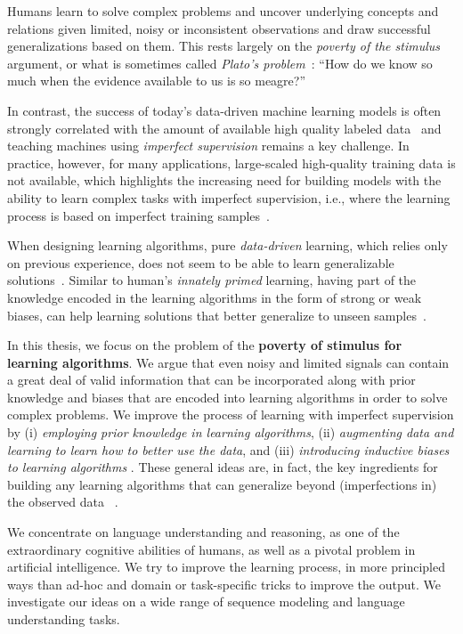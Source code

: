 \abstract
Humans learn to solve complex problems and uncover underlying concepts and relations given limited, noisy or inconsistent observations and draw successful generalizations based on them. This rests largely on the \emph{poverty of the stimulus} argument, or what is sometimes called \emph{Plato’s problem}~\citep{chomsky1986knowledge}: ``How do we know so much when the evidence available to us is so meagre?''

In contrast, the success of today's data-driven machine learning models is often strongly correlated with the amount of available high quality labeled data~\citep{halevy2009unreasonable,sun2017revisiting} and teaching machines using \emph{imperfect supervision} remains a key challenge. In practice, however, for many applications, large-scaled high-quality training data is not available, which highlights the increasing need for building models with the ability to learn complex tasks with imperfect supervision, i.e., where the learning process is based on imperfect training samples~\citep{zhou2018brief}.

When designing learning algorithms, pure \emph{data-driven} learning, which relies only on previous experience, does not seem to be able to learn generalizable solutions~\citep{Mitchell80theneed}. Similar to human's \emph{innately primed} learning, having part of the knowledge encoded in the learning algorithms in the form of strong or weak biases, can help learning solutions that better generalize to unseen samples~\citep{Mitchell:1997:ML}.

In this thesis, we focus on the problem of the \textbf{poverty of stimulus for learning algorithms}. We argue that even noisy and limited signals can contain a great deal of valid information that can be incorporated along with prior knowledge and biases that are encoded into learning algorithms in order to solve complex problems. We improve the process of learning with imperfect supervision by (i) \emph{employing  prior knowledge in learning algorithms}, (ii) \emph{augmenting data and learning to learn how to better use the data}, and (iii) \emph{introducing inductive biases to learning algorithms} . 
%
These general ideas are, in fact, the key ingredients for building any learning algorithms that can generalize beyond (imperfections in) the observed data ~\citep{Mitchell80theneed}.

We concentrate on language understanding and reasoning, as one of the extraordinary cognitive abilities of humans, as well as a pivotal problem in artificial intelligence. We try to improve the learning process, in more principled ways than ad-hoc and domain or task-specific tricks to improve the output. We investigate our ideas on a wide range of sequence modeling and language understanding tasks.


